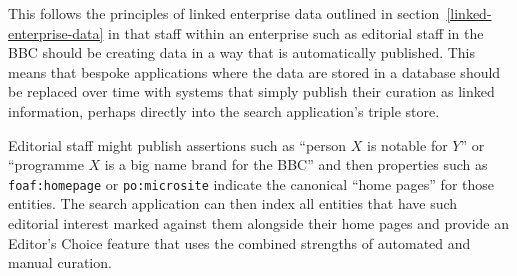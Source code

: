 This follows the principles of linked enterprise data outlined in
section~\ref{linked-enterprise-data} in that staff within
an enterprise such as editorial staff in the BBC should be
creating data in a way that is automatically published. This
means that bespoke applications where the data are stored in
a database should be replaced over time with systems that
simply publish their curation as linked information, perhaps
directly into the search application's triple store.

Editorial staff might publish assertions such as
``person $X$ is notable for $Y$'' or
``programme $X$ is a big name brand for the BBC'' and then
properties such as \texttt{foaf:homepage}\cite{brickley2012foaf} or
\texttt{po:microsite}\cite{raimond2009bbc} indicate the canonical
``home pages'' for those entities. The search application can
then index all entities that have such editorial interest marked
against them alongside their home pages and provide an
Editor's Choice feature that uses the combined strengths
of automated and manual curation.
